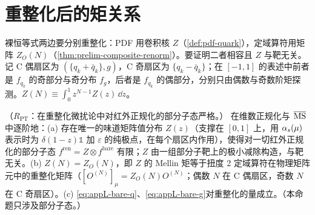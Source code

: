 \section{重整化后的矩关系}\label{sec:appL-renormalized}

裸恒等式两边要分别重整化：PDF 用卷积核 $Z$（\cref{def:pdf-quark}），定域算符用矩阵 $Z_O(N)$（\cref{thm:prelim-composite-renorm}）。要证明二者相容且 $Z$ 与靶无关。记 C 偶扇区为 $(\{q_k+\bar q_k\},g)$，C 奇扇区为 $\{q_k-\bar q_k\}$；在 $[-1,1]$ 的表述中前者是 $f_{q_k}$ 的奇部分与奇分布 $f_g$，后者是 $f_{q_k}$ 的偶部分，分别只由偶数与奇数阶矩探测。$Z(N)\equiv\int_0^1z^{N-1}Z(z)\,\dd z$。

\begin{proposition}\label{prop:appL-renormalized}
（$R_{\mathrm{PT}}$：在重整化微扰论中对红外正规化的部分子态严格。）
在维数正规化与 $\overline{\mathrm{MS}}$ 中逐阶地：(a) 存在唯一的味道矩阵值分布 $Z(z)$（支撑在 $[0,1]$ 上，用 $\alpha_s(\mu)$ 表示时为 $\delta(1-z)\mathbb 1$ 加 $\varepsilon$ 的纯极点，在每个扇区内作用），使得对一切红外正规化的部分子态 $f^{\mathrm{ren}}=Z\otimes f^{\mathrm{bare}}$ 有限；$Z$ 由一组部分子靶上的极小减除构造，与靶无关。(b) $Z(N)=Z_O(N)$，即 $Z$ 的 Mellin 矩等于扭度 2 定域算符在物理矩阵元中的重整化矩阵（$[O^{(N)}]_\mu=Z_O(N)O^{(N)}$；偶数 $N$ 在 C 偶扇区，奇数 $N$ 在 C 奇扇区）。(c) \cref{eq:appL-bare-q}、\cref{eq:appL-bare-g}对重整化的量成立。（本命题只涉及部分子态。）
\end{proposition}

